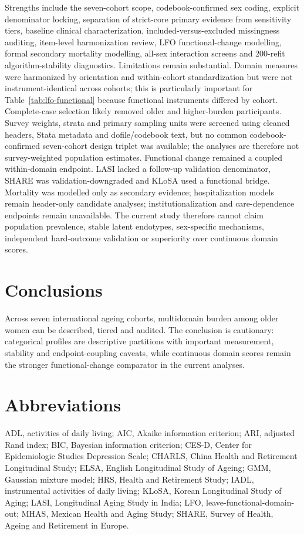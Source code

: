 \documentclass[pdflatex,sn-vancouver-num]{sn-jnl}
\begin{document}
Strengths include the seven-cohort scope, codebook-confirmed sex coding, explicit denominator locking, separation of strict-core primary evidence from sensitivity tiers, baseline clinical characterization, included-versus-excluded missingness auditing, item-level harmonization review, LFO functional-change modelling, formal secondary mortality modelling, all-sex interaction screens and 200-refit algorithm-stability diagnostics. Limitations remain substantial. Domain measures were harmonized by orientation and within-cohort standardization but were not instrument-identical across cohorts; this is particularly important for Table~\ref{tab:lfo-functional} because functional instruments differed by cohort. Complete-case selection likely removed older and higher-burden participants. Survey weights, strata and primary sampling units were screened using cleaned headers, Stata metadata and dofile/codebook text, but no common codebook-confirmed seven-cohort design triplet was available; the analyses are therefore not survey-weighted population estimates. Functional change remained a coupled within-domain endpoint. LASI lacked a follow-up validation denominator, SHARE was validation-downgraded and KLoSA used a functional bridge. Mortality was modelled only as secondary evidence; hospitalization models remain header-only candidate analyses; institutionalization and care-dependence endpoints remain unavailable. The current study therefore cannot claim population prevalence, stable latent endotypes, sex-specific mechanisms, independent hard-outcome validation or superiority over continuous domain scores.

\section{Conclusions}\label{sec:conclusions}

Across seven international ageing cohorts, multidomain burden among older women can be described, tiered and audited. The conclusion is cautionary: categorical profiles are descriptive partitions with important measurement, stability and endpoint-coupling caveats, while continuous domain scores remain the stronger functional-change comparator in the current analyses.

\section*{Abbreviations}

ADL, activities of daily living; AIC, Akaike information criterion; ARI, adjusted Rand index; BIC, Bayesian information criterion; CES-D, Center for Epidemiologic Studies Depression Scale; CHARLS, China Health and Retirement Longitudinal Study; ELSA, English Longitudinal Study of Ageing; GMM, Gaussian mixture model; HRS, Health and Retirement Study; IADL, instrumental activities of daily living; KLoSA, Korean Longitudinal Study of Aging; LASI, Longitudinal Aging Study in India; LFO, leave-functional-domain-out; MHAS, Mexican Health and Aging Study; SHARE, Survey of Health, Ageing and Retirement in Europe.
\end{document}
